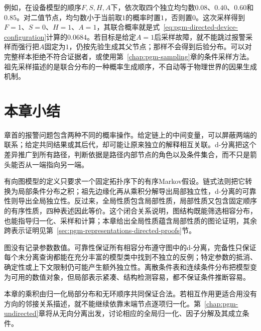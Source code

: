例如，在设备模型的顺序$F,S,H,A$下，依次取四个独立均匀数$0.08$、$0.40$、$0.60$和$0.85$。对二值节点，均匀数小于当前取$1$的概率时置$1$，否则置$0$。这次采样得到$F=1$、$S=0$、$H=1$、$A=1$，其联合概率就是式~\eqref{eq:pgm-directed-device-configuration}计算的$0.0684$。若目标是给定$A=1$后采样故障，就不能跳过报警采样而强行把$A$固定为$1$，仍按先验生成其父节点；那样不会得到后验分布。可以对完整样本拒绝不符合证据者，或使用第~\ref{chap:pgm-sampling}章的条件采样方法。祖先采样描述的是联合分布的一种概率生成顺序，不自动等于物理世界的因果生成机制。

\section{本章小结}
\label{sec:pgm-directed-summary}

章首的报警问题包含两种不同的概率操作。给定链上的中间变量，可以屏蔽两端的联系；给定共同结果或其后代，却可能让原来独立的解释相互关联。d-分离把这个差异推广到所有路径，判断依据是路径内部节点的角色以及条件集合，而不只是箭头能否从一端指向另一端。

有向图模型的定义只要求一个固定拓扑序下的有序Markov假设。链式法则把它转换为局部条件分布之积；祖先边缘化再从乘积分解导出局部独立性，d-分离的可靠性则导出全局独立性。反过来，全局性质包含局部性质，局部性质又包含固定顺序的有序性质，四种表述因此等价。这个闭合关系说明，图结构既能筛选相容分布，也能指导归一化、采样和计算；本章给出全局性质蕴含局部性质的图论证明，其余跨表示证明见第~\ref{sec:pgm-representations-directed-proofs}节。

图没有记录参数数值。可靠性保证所有相容分布遵守图中的d-分离，完备性只保证每个未分离查询都能在充分丰富的模型类中找到不独立的反例；特定参数的抵消、确定性或上下文限制仍可能产生额外独立性。离散条件表和连续条件分布把模型变为可用的数值对象，但局部表示紧凑、结构检测容易，都不保证条件推断容易。

本章的乘积由归一化局部分布和无环顺序共同保证合法。若相互作用更适合用没有方向的邻接关系描述，就不能继续依靠末端节点逐项归一化。第~\ref{chap:pgm-undirected}章将从无向分离出发，讨论相应的全局归一化、因子分解及其成立条件。
